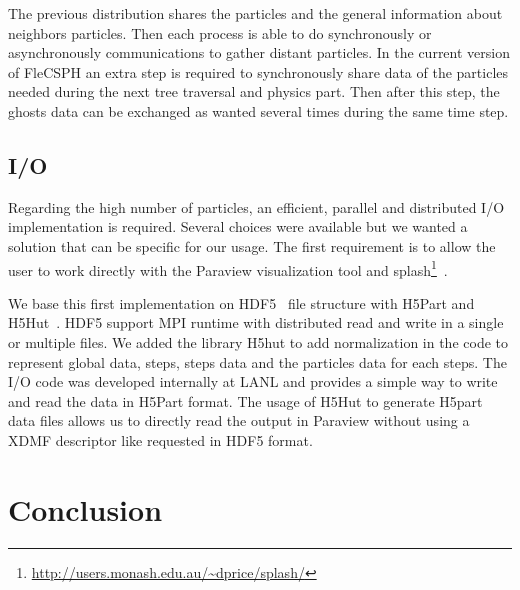 The previous distribution shares the particles and the general information about neighbors particles. 
Then each process is able to do synchronously or asynchronously communications to gather distant particles. 
In the current version of FleCSPH an extra step is required to synchronously share data of the particles needed during the next tree traversal and physics part. 
Then after this step, the ghosts data can be exchanged as wanted several times during the same time step. 

\subsection{I/O}
Regarding the high number of particles, an efficient, parallel and distributed I/O implementation is required. 
Several choices were available but we wanted a solution that can be specific for our usage. 
The first requirement is to allow the user to work directly with the Paraview visualization tool and splash\footnote{\url{http://users.monash.edu.au/~dprice/splash/}}~\cite{price2007splash}.

We base this first implementation on HDF5~\cite{folk1999hdf5} file structure with H5Part and H5Hut~\cite{howison2010h5hut}. 
HDF5 support MPI runtime with distributed read and write in a single or multiple files. 
We added the library H5hut to add normalization in the code to represent global data, steps, steps data and the particles data for each steps.
The I/O code was developed internally at LANL and provides a simple way to write and read the data in H5Part format. 
The usage of H5Hut to generate H5part data files allows us to directly read the output in Paraview without using a XDMF descriptor like requested in HDF5 format.


\section{Conclusion}